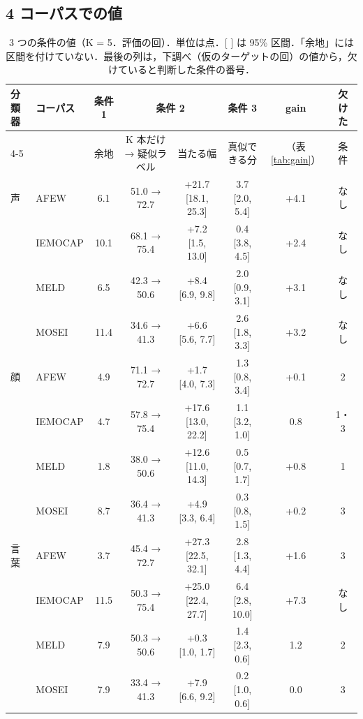 \documentclass[a4paper,11pt]{ltjsarticle}
\begin{document}
\subsection{4 コーパスでの値}

\begin{table}[H]
\centering
\small
\caption{3 つの条件の値（K = 5．評価の回）．単位は点．[ ] は 95\% 区間．「余地」には区間を付けていない．最後の列は，下調べ（仮のターゲットの回）の値から，欠けていると判断した条件の番号．}
\label{tab:cond}
\setlength{\tabcolsep}{3pt}
\begin{tabular}{llcccccc}
\toprule
分類器 & コーパス & 条件 1 & \multicolumn{2}{c}{条件 2} & 条件 3 & gain & 欠けた \\
\cmidrule(lr){4-5}
 & & 余地 & K 本だけ → 疑似ラベル & 当たる幅 & 真似できる分 & （表\ref{tab:gain}） & 条件 \\
\midrule
\textcolor{cA}{声} & AFEW    & 6.1  & 51.0 → 72.7 & +21.7 [18.1, 25.3] & 3.7 [2.0, 5.4] & +4.1 & なし \\
                   & IEMOCAP & 10.1 & 68.1 → 75.4 & +7.2 [1.5, 13.0]  & 0.4 [\textminus{}3.8, 4.5] & +2.4 & なし \\
                   & MELD    & 6.5  & 42.3 → 50.6 & +8.4 [6.9, 9.8]   & 2.0 [0.9, 3.1] & +3.1 & なし \\
                   & MOSEI   & 11.4 & 34.6 → 41.3 & +6.6 [5.6, 7.7]   & 2.6 [1.8, 3.3] & +3.2 & なし \\
\midrule
\textcolor{cV}{顔} & AFEW    & 4.9  & 71.1 → 72.7 & +1.7 [\textminus{}4.0, 7.3]  & 1.3 [\textminus{}0.8, 3.4] & +0.1 & 2 \\
                   & IEMOCAP & 4.7  & 57.8 → 75.4 & +17.6 [13.0, 22.2] & \textminus{}1.1 [\textminus{}3.2, 1.0] & \textminus{}0.8 & 1・3 \\
                   & MELD    & 1.8  & 38.0 → 50.6 & +12.6 [11.0, 14.3] & 0.5 [\textminus{}0.7, 1.7] & +0.8 & 1 \\
                   & MOSEI   & 8.7  & 36.4 → 41.3 & +4.9 [3.3, 6.4]   & 0.3 [\textminus{}0.8, 1.5] & +0.2 & 3 \\
\midrule
\textcolor{cT}{言葉} & AFEW    & 3.7  & 45.4 → 72.7 & +27.3 [22.5, 32.1] & 2.8 [1.3, 4.4] & +1.6 & 3 \\
                     & IEMOCAP & 11.5 & 50.3 → 75.4 & +25.0 [22.4, 27.7] & 6.4 [2.8, 10.0] & +7.3 & なし \\
                     & MELD    & 7.9  & 50.3 → 50.6 & +0.3 [\textminus{}1.0, 1.7]  & \textminus{}1.4 [\textminus{}2.3, \textminus{}0.6] & \textminus{}1.2 & 2 \\
                     & MOSEI   & 7.9  & 33.4 → 41.3 & +7.9 [6.6, 9.2]   & \textminus{}0.2 [\textminus{}1.0, 0.6] & \textminus{}0.0 & 3 \\
\bottomrule
\end{tabular}
\end{table}
\end{document}
